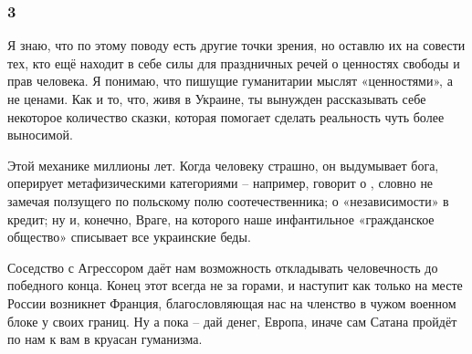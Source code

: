  
 
 
 
 
\subsubsection{3}

Я знаю, что по этому поводу есть другие точки зрения, но оставлю их на совести
тех, кто ещё находит в себе силы для праздничных речей о ценностях свободы и
прав человека. Я понимаю, что пишущие гуманитарии мыслят «ценностями», а не
ценами. Как и то, что, живя в Украине, ты вынужден рассказывать себе некоторое
количество сказки, которая помогает сделать реальность чуть более выносимой. 

Этой механике миллионы лет. Когда человеку страшно, он выдумывает бога,
оперирует метафизическими категориями – например, говорит о , словно не замечая ползущего по польскому полю соотечественника; о
«независимости» в кредит; ну и, конечно, Враге, на которого наше инфантильное
«гражданское общество» списывает все украинские беды.

Соседство с Агрессором даёт нам возможность откладывать человечность до
победного конца. Конец этот всегда не за горами, и наступит как только на месте
России возникнет Франция, благословляющая нас на членство в чужом военном блоке
у своих границ. Ну а пока – дай денег, Европа, иначе сам Сатана пройдёт по нам
к вам в круасан гуманизма.
